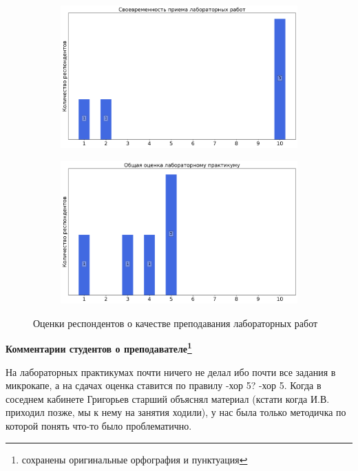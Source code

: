 \begin{figure}[H]
\begin{subfigure}[b]{0.45\textwidth}
                \includegraphics[width=\textwidth]{images/2 course/Радиотехнические цепи и сигналы/labniks-marks-Филатов И.В.-2.png}
            \end{subfigure}
            \begin{subfigure}[b]{0.45\textwidth}
                \centering
                \includegraphics[width=\textwidth]{images/2 course/Радиотехнические цепи и сигналы/labniks-marks-Филатов И.В.-3.png}
            \end{subfigure}	
            \caption{Оценки респондентов о качестве преподавания лабораторных работ}
        \end{figure}

        \textbf{Комментарии студентов о преподавателе\protect\footnote{сохранены оригинальные орфография и пунктуация}}
        
            \begin{commentbox} 
                На лабораторных практикумах почти ничего не делал ибо почти все задания в микрокапе, а на сдачах оценка ставится по правилу -хор 5? -хор 5. Когда в соседнем кабинете Григорьев старший объяснял материал (кстати когда И.В. приходил позже, мы к нему на занятия ходили), у нас была только методичка по которой понять что-то было проблематично.
            \end{commentbox} 

